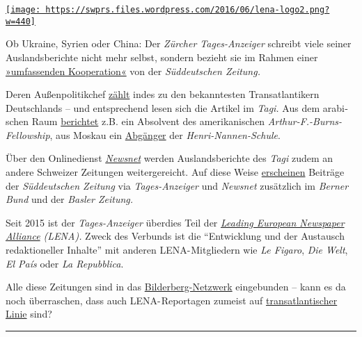 \href{https://swprs.org/2017/03/01/warum-der-tagesanzeiger-nichts-verpasst/}{\texttt{[image: https://swprs.files.wordpress.com/2016/06/lena-logo2.png?w=440]}}

Ob Ukraine, Syrien oder Chi­na: Der \emph{Zürcher Tages-Anzeiger}
schreibt viele seiner Aus­lands­berichte nicht mehr selbst, sondern
bezieht sie im Rah­men einer
\href{https://www.tagesanzeiger.ch/schweiz/standard/In-eigener-Sache/story/24648194}{»umfassenden
Ko­ope­ra­tion«} von der \emph{Süd­deut­schen Zeitung.}

Deren Außen­politik­chef
\href{https://swprs.org/netzwerk-medien-deutschland/}{zählt} indes zu
den bekanntesten Trans­at­lan­tikern Deutsch­lands -- und ent­spre­chend
le­sen sich die Arti­kel im \emph{Tagi.} Aus dem ara­bi­schen Raum
\href{https://web.archive.org/web/20170606085220/http://www.icfj.org/sites/default/files/Kr\%C3\%BCger.pdf}{berichtet}
z.B. ein Absol­vent des ameri­ka­ni­schen
\emph{Arthur-F.-Burns-Fellowship}, aus Mos­kau ein
\href{https://spiegelkabinett-blog.blogspot.com/2016/09/julian-hans-von-der-suddeutschen.html}{Ab­gänger}
der \emph{Henri-Nannen-Schule}.

Über den Onlinedienst
\emph{\href{https://de.wikipedia.org/wiki/Newsnet}{Newsnet}} werden
Aus­lands­be­rich­te des \emph{Tagi} zudem an andere Schwei­zer
Zei­tungen wei­ter­ge­reicht. Auf diese Weise
\href{http://www.tagesanzeiger.ch/ausland/europa/Den-Ausloeser-zum-Krieg-habe-ich-gedrueckt/story/16330278}{er­scheinen}
Beiträge der \emph{Süd­deutschen Zeitung} via \emph{Tages­-Anzeiger} und
\emph{Newsnet} zu­sätz­lich im \emph{Berner Bund} und der \emph{Basler
Zeitung.}

Seit 2015 ist der \emph{Tages­-Anzeiger} über­dies Teil der
\emph{\href{https://de.wikipedia.org/wiki/Leading_European_Newspaper_Alliance}{Leading
European News­paper Alliance} (LENA).} Zweck des Ver­bunds ist die
``Ent­wick­lung und der Aus­tausch re­dak­tio­neller In­hal­te'' mit
anderen LENA- Mit­glie­dern wie \emph{Le Fi­g­aro}, \emph{Die Welt},
\emph{El País} oder \emph{La Re­pub­blica}.

Alle diese Zei­tungen sind in das
\href{https://swprs.files.wordpress.com/2016/07/bilderberg_teilnehmer_1954-2014.pdf}{Bilder­berg-Netz­werk}
ein­ge­bun­den -- kann es da noch über­raschen, dass auch
LENA- Repor­ta­gen zumeist auf
\href{http://www.tagesanzeiger.ch/ausland/europa/Wer-sagt-was-er-denkt-nobrriskiert-allesnobr/story/17225010}{trans­at­lan­tischer
Linie} sind?

\begin{center}\rule{0.5\linewidth}{\linethickness}\end{center}

